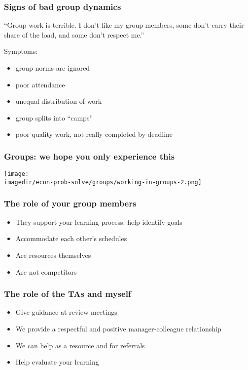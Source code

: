 \begin{frame}\frametitle{Signs of bad group dynamics}
	\begin{exampleblock}{}
		``Group work is terrible. I don't like my group members, some don't carry their share of the load, and some don't respect me.''
	\end{exampleblock}
	Symptoms:
	\begin{itemize}
		\item	group norms are ignored
		\item	poor attendance
		\item	unequal distribution of work
		\item	group splits into ``camps''
		\item	poor quality work, not really completed by deadline
	\end{itemize}
\end{frame}

\begin{frame}\frametitle{Groups: we hope you only experience this}
	\begin{center}
		\texttt{[image: \\imagedir/econ-prob-solve/groups/working-in-groups-2.png]}
	\end{center}
\end{frame}

\begin{frame}\frametitle{The role of your group members}
	\begin{itemize}
		\item	They support your learning process: help identify goals
		\item	Accommodate each other's schedules		
		\item	Are resources themselves
		\item	Are not competitors		
	\end{itemize}
\end{frame}

\begin{frame}\frametitle{The role of the TAs and myself}
	\begin{itemize}
		\item	Give guidance at review meetings
		\item	We provide a respectful and positive manager-colleague relationship
		\item	We can help as a resource and for referrals
		\item	Help evaluate your learning	
	\end{itemize}	
\end{frame}

